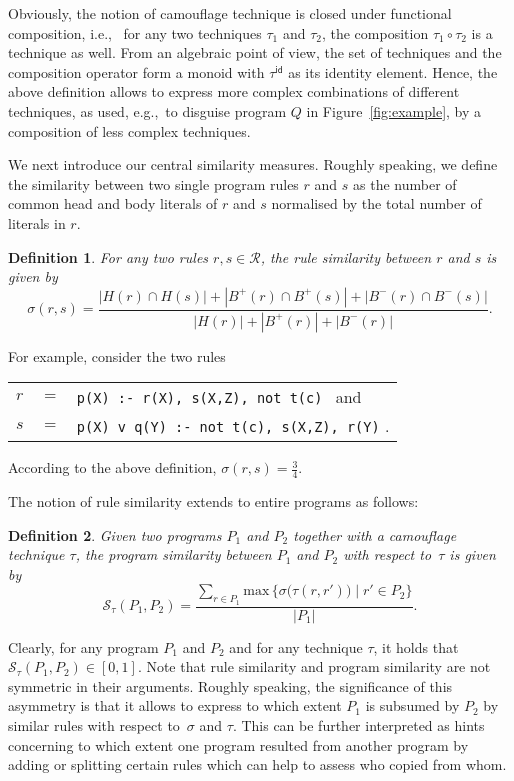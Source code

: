 \documentclass{tlp}
\newcommand{\wrt}[0]{with respect to}
\newcommand{\iec}[0]{i.e.,\ }
\newcommand{\egc}[0]{e.g.,\ }
\newcommand{\head}[1]{\mathit{H}(#1)}
\newcommand{\posbody}[1]{\mathit{B^{+}}(#1)}
\newcommand{\negbody}[1]{\mathit{B^{-}}(#1)}
\renewcommand{\max}[1]{\mathrm{max}\,{#1}}
\newcommand{\rules}{\mathcal{R}}
\newcommand{\identity}{\tau^{\mathsf{id}}}
\newcommand{\rulesim}[2]{\sigma({#1},{#2})}
\newcommand{\progsim}[3]{\mathcal{S}_{#3}({#1},{#2})}
\newtheorem{definition}{Definition}
\begin{document}
Obviously, the notion of camouflage technique is closed under functional composition, \iec
for any two techniques $\tau_{1}$ and $\tau_{2}$, the composition $\tau_{1} \circ \tau_{2}$ is
a technique as well.
From an algebraic point of view, the set of techniques and the composition operator form a monoid  with
$\identity$ as its identity element. 
Hence, the above definition allows to express more complex combinations of different techniques, as used, \egc to disguise program $Q$ 
in Figure~\ref{fig:example}, by a composition of less complex  techniques. 
  
We next introduce our central similarity measures.
Roughly speaking, we define the similarity between two single program rules $r$ and $s$ as
the number of common head and body literals of $r$ and $s$ normalised by the total number of
literals in $r$. 

\begin{definition}\label{def:rulesim}
For any two rules $r,s \in \rules$, 
the \emph{rule similarity between $r$ and $s$} is given by
\[
\rulesim{r}{s} = 
\frac{{|\head{r} \cap \head{s} |+ |\posbody{r} \cap \posbody{s}|  + |\negbody{r} \cap \negbody{s}|}}
{|\head{r}| + |\posbody{r}| + |\negbody{r}|}.
\]
\end{definition}

For example, consider the two rules
\begin{center}
\begin{tabular}{l@{}c@{}l}
$r$ & $=$  &{\tt \small p(X) :- r(X), s(X,Z), not t(c)} \ and \\
$s$ & $=$ & {\tt \small p(X) v q(Y) :- not\ t(c), s(X,Z), r(Y)} .
\end{tabular}
\end{center}
According to the above definition, $\rulesim{r}{s} = \frac{3}{4}$.

The notion of rule similarity extends to entire programs as follows:

\begin{definition}\label{def:progsim}
Given two programs $P_{1}$ and $P_{2}$ together with a camouflage technique $\tau$,
 the \emph{program similarity between $P_{1}$ and $P_{2}$ \wrt\ $\tau$} is given by
\[
\progsim{P_1}{P_2}{\tau} = \frac{\sum_{r \in P_1}  \max{\{\sigma\big(\tau(r,r')\big) \mid r' \in P_2\}}}{|P_1|} .
\]
\end{definition}

Clearly, for any program $P_1$ and $P_2$ and for any technique $\tau$, it holds that
$\progsim{P_{1}}{P_2}{\tau}\in[0,1]$.
Note that rule similarity and  program similarity are not symmetric in their arguments.
 Roughly speaking, the significance of this asymmetry is that it allows to express
to which extent $P_1$ is subsumed by $P_2$ by similar rules \wrt\ $\sigma$ and $\tau$.
This can be further interpreted as hints concerning to which extent one program resulted from another program
by adding or splitting certain rules which can help to assess who copied from whom.
\end{document}

